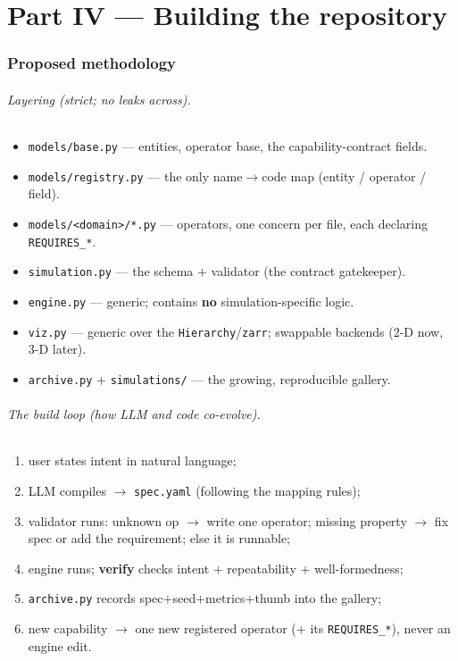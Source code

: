 \documentclass[11pt]{article}
\newcommand{\code}[1]{\texttt{#1}}
\begin{document}
\part*{Part IV --- Building the repository}

\section{Proposed methodology}

\paragraph{Layering (strict; no leaks across).}
\begin{itemize}\itemsep1pt
\item \code{models/base.py} --- entities, operator base, the capability-contract fields.
\item \code{models/registry.py} --- the only name$\to$code map (entity / operator / field).
\item \code{models/<domain>/*.py} --- operators, one concern per file, each declaring \code{REQUIRES\_*}.
\item \code{simulation.py} --- the schema $+$ validator (the contract gatekeeper).
\item \code{engine.py} --- generic; contains \textbf{no} simulation-specific logic.
\item \code{viz.py} --- generic over the \code{Hierarchy}/\code{zarr}; swappable backends (2-D now, 3-D later).
\item \code{archive.py} $+$ \code{simulations/} --- the growing, reproducible gallery.
\end{itemize}

\paragraph{The build loop (how LLM and code co-evolve).}
\begin{enumerate}\itemsep1pt
\item user states intent in natural language;
\item LLM compiles $\to$ \code{spec.yaml} (following the mapping rules);
\item validator runs: unknown op $\to$ write one operator; missing property $\to$ fix
spec or add the requirement; else it is runnable;
\item engine runs; \textbf{verify} checks intent $+$ repeatability $+$ well-formedness;
\item \code{archive.py} records spec$+$seed$+$metrics$+$thumb into the gallery;
\item new capability $\to$ one new registered operator ($+$ its \code{REQUIRES\_*}),
never an engine edit.
\end{enumerate}
\end{document}
